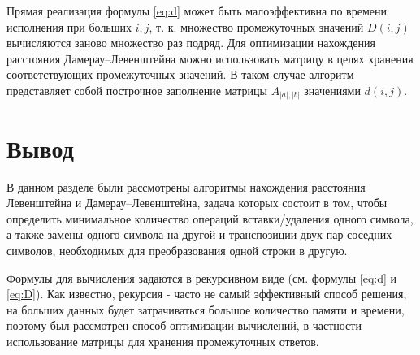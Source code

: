 Прямая реализация формулы \ref{eq:d} может быть малоэффективна по времени исполнения при больших $i, j$, т. к. множество промежуточных значений $D(i, j)$ вычисляются заново множество раз подряд. Для оптимизации нахождения расстояния Дамерау--Левенштейна можно использовать матрицу в целях хранения соответствующих промежуточных значений. В таком случае алгоритм представляет собой построчное заполнение матрицы 
$A_{|a|,|b|}$ значениями $d(i, j)$.


\section{Вывод}

В данном разделе были рассмотрены алгоритмы нахождения расстояния Левенштейна и Дамерау--Левенштейна, задача которых состоит в том, чтобы определить минимальное количество операций вставки/удаления одного символа, а также замены одного символа на другой и транспозиции двух пар соседних символов, необходимых для преобразования одной строки в другую.

Формулы для вычисления задаются в рекурсивном виде (см. формулы \ref{eq:d} и \ref{eq:D}). Как известно, рекурсия - часто не самый эффективный способ решения, на больших данных будет затрачиваться большое количество памяти и времени, поэтому был рассмотрен способ оптимизации вычислений, в частности использование матрицы для хранения промежуточных ответов.
